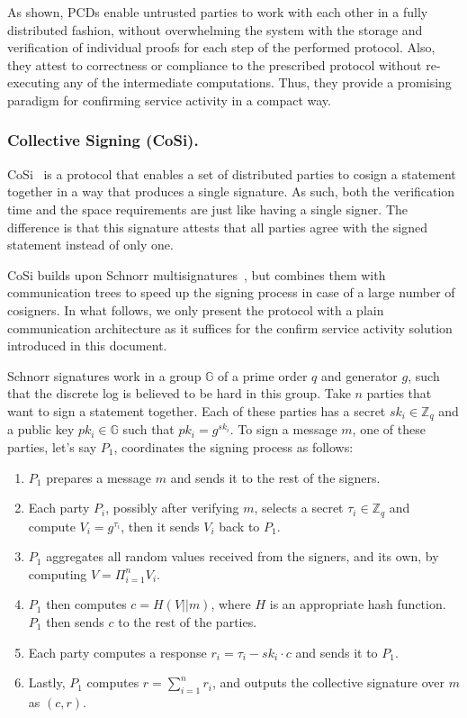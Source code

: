 As shown, PCDs enable untrusted parties to work with each other in a fully distributed 
fashion, without overwhelming the system with the storage and verification of individual 
proofs for each step of the performed protocol. Also, they attest to correctness or compliance  
to the prescribed protocol without re-executing any of the intermediate computations. Thus, 
they provide a promising paradigm for confirming service activity in a compact way.


\subsubsection{Collective Signing (CoSi).}
\label{cosi}
CoSi~\cite{syta2016keeping} is a protocol that enables a set of distributed parties to cosign a 
statement together in a way that produces a single signature. As such, both the 
verification time and the space requirements are just like having a single signer. The 
difference is that this signature attests that all parties agree with the signed 
statement instead of only one.


CoSi builds upon Schnorr 
multisignatures~\cite{schnorr1991efficient, bellare2006multi, micali2001accountable}, but combines 
them with communication trees to speed up the signing process in 
case of a large number of cosigners. In what follows, we only present the protocol
with a plain communication architecture as it suffices for the confirm service activity 
solution introduced in this document.


Schnorr signatures work in a group $\mathbb{G}$ of a prime order $q$ and 
generator $g$, such that the discrete log is believed to be hard in this group. 
Take $n$ parties that want to sign a statement together. 
Each of these parties has a secret $sk_i \in \mathbb{Z}_q$ and a public key 
$pk_i \in \mathbb{G}$ such that $pk_i = g^{sk_i}$. To sign a message $m$, 
one of these parties, let's say $P_1$, coordinates the signing process as follows: 
\begin{enumerate}
\setlength{\itemsep}{0pt}
\item $P_1$ prepares a message $m$ and sends it to the rest of the signers.

\item Each party $P_i$, possibly after verifying 
$m$, selects a secret $\tau_i \in \mathbb{Z}_q$ and compute $V_i = g^{\tau_i}$, 
then it sends $V_i$ back to $P_1$.

\item $P_1$ aggregates all random values received from 
the signers, and its own, by computing $V = \Pi_{i =1}^n V_i$.

\item $P_1$ then computes 
$c = H(V||m)$, where $H$ is an appropriate hash function. $P_1$ then 
sends $c$ to the rest of the parties.

\item Each party computes a response $r_i = \tau_i - sk_i\cdot c$ and 
sends it to $P_1$.

\item Lastly, $P_1$ computes $r = \sum_{i=1}^n r_i$, and outputs the 
collective signature over $m$ as $(c, r)$.
\end{enumerate}


